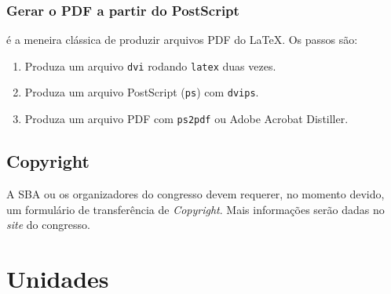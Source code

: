 \documentclass[a4paper]{ifacconf}
\begin{document}

\subsubsection{Gerar o PDF a partir do PostScript} 
é a meneira clássica de produzir arquivos PDF do \LaTeX. Os passos são: 


\begin{enumerate}
  \item Produza um arquivo \texttt{dvi} rodando \texttt{latex} duas vezes. 
  \item Produza um arquivo PostScript (\texttt{ps}) com \texttt{dvips}.
  \item Produza um arquivo PDF com \texttt{ps2pdf} ou Adobe Acrobat
  Distiller.
\end{enumerate}

\subsection{Copyright}

A SBA ou os organizadores do congresso devem requerer, no momento devido, 
um formulário de transferência de {\em Copyright}. Mais informações serão
dadas no {\em site} do congresso.


\section{Unidades}
\end{document}

